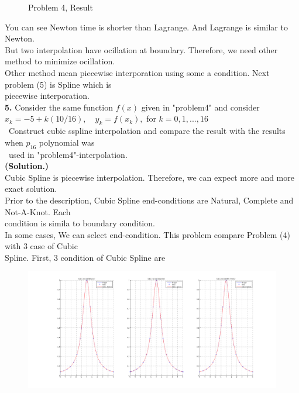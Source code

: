 \documentclass[10pt]{article}
\begin{document}
\begin{flushleft}
\begin{figure}[!h]
\begin{center}
		\caption{Problem 4, Result}
		\end{center}
	\end{figure}
	\quad\: You can see Newton time is shorter than Lagrange. And Lagrange is similar to Newton.\\
	\quad\: But two interpolation have ocillation at boundary. Therefore, we need other method to minimize ocillation.\\
	\quad\: Other method mean piecewise interporation using some a condition. Next problem (5) is Spline which is\\
	\quad\: piecewise interporation.\\
	\newpage
	\textbf{5.} Consider the same function $f(x)$ given in "problem4" and consider\\
	\;\;\;
	\qquad \qquad \qquad \qquad\qquad\qquad\qquad $x_k=-5+k(10/16),\quad y_k=f(x_k),$ for $k=0,1,...,16$\\
	\;\;\;
	\quad\, Construct cubic sspline interpolation and compare the result with the results when $p_{16}$ polynomial was \\
	\quad\, used in "problem4"-interpolation.\\
	\;\;\;
	\quad\: \textbf{(Solution.)} \\
	\quad\: Cubic Spline is piecewise interpolation. Therefore, we can expect more and more exact solution.\\
	\quad\: Prior to the description, Cubic Spline end-conditions are Natural, Complete and Not-A-Knot. Each \\
	\quad\: condition is simila to boundary condition.\\
	\quad\: In some cases, We can select end-condition. This problem compare Problem (4) with 3 case of Cubic \\
	\quad\: Spline. First, 3 condition of Cubic Spline are\\
	\begin{figure}[!h]
		\centering
		\begin{center}
		\includegraphics[width=1\textwidth]{5.png}

\end{center}
\end{figure}
\end{flushleft}
\end{document}
